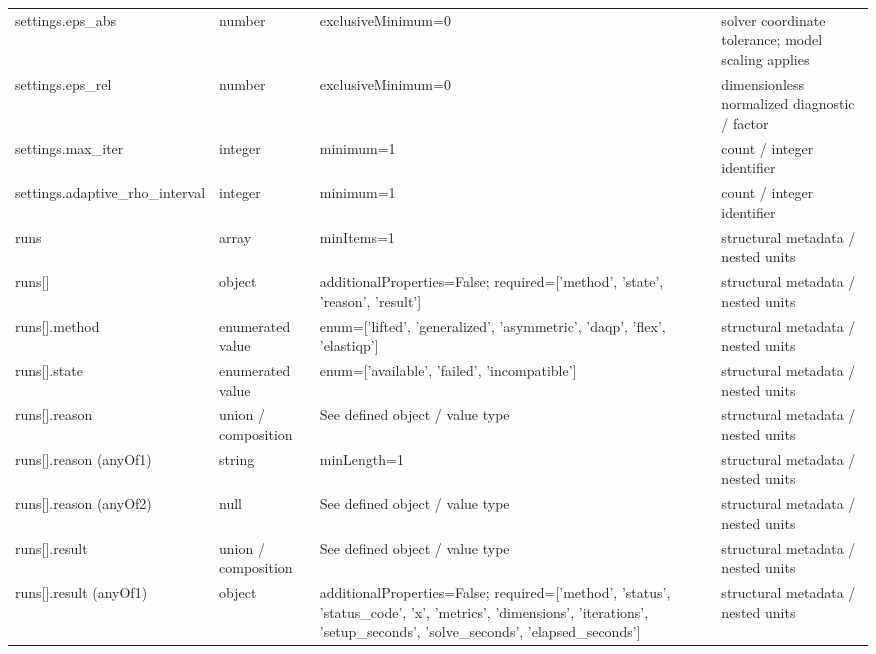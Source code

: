 \begin{longtable}{@{}>{\raggedright\arraybackslash}p{}>{\raggedright\arraybackslash}p{}>{\raggedright\arraybackslash}p{}>{\raggedright\arraybackslash}p{}@{}}
settings.\allowbreak{}eps\_\allowbreak{}abs & number & exclusiveMinimum=\allowbreak{}0 & solver coordinate tolerance; model scaling applies\\
settings.\allowbreak{}eps\_\allowbreak{}rel & number & exclusiveMinimum=\allowbreak{}0 & dimensionless normalized diagnostic /\allowbreak{} factor\\
settings.\allowbreak{}max\_\allowbreak{}iter & integer & minimum=\allowbreak{}1 & count /\allowbreak{} integer identifier\\
settings.\allowbreak{}adaptive\_\allowbreak{}rho\_\allowbreak{}interval & integer & minimum=\allowbreak{}1 & count /\allowbreak{} integer identifier\\
runs & array & minItems=\allowbreak{}1 & structural metadata /\allowbreak{} nested units\\
runs[] & object & additionalProperties=\allowbreak{}False; required=\allowbreak{}['method', 'state', 'reason', 'result'] & structural metadata /\allowbreak{} nested units\\
runs[].\allowbreak{}method & enumerated value & enum=\allowbreak{}['lifted', 'generalized', 'asymmetric', 'daqp', 'flex', 'elastiqp'] & structural metadata /\allowbreak{} nested units\\
runs[].\allowbreak{}state & enumerated value & enum=\allowbreak{}['available', 'failed', 'incompatible'] & structural metadata /\allowbreak{} nested units\\
runs[].\allowbreak{}reason & union /\allowbreak{} composition & See defined object /\allowbreak{} value type & structural metadata /\allowbreak{} nested units\\
runs[].\allowbreak{}reason (anyOf1) & string & minLength=\allowbreak{}1 & structural metadata /\allowbreak{} nested units\\
runs[].\allowbreak{}reason (anyOf2) & null & See defined object /\allowbreak{} value type & structural metadata /\allowbreak{} nested units\\
runs[].\allowbreak{}result & union /\allowbreak{} composition & See defined object /\allowbreak{} value type & structural metadata /\allowbreak{} nested units\\
runs[].\allowbreak{}result (anyOf1) & object & additionalProperties=\allowbreak{}False; required=\allowbreak{}['method', 'status', 'status\_\allowbreak{}code', 'x', 'metrics', 'dimensions', 'iterations', 'setup\_\allowbreak{}seconds', 'solve\_\allowbreak{}seconds', 'elapsed\_\allowbreak{}seconds'] & structural metadata /\allowbreak{} nested units\\

\end{longtable}
